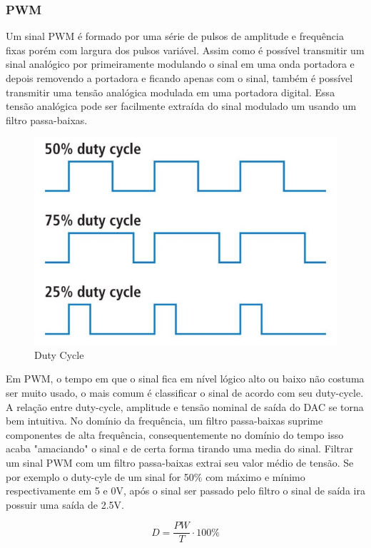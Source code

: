 \subsubsection{PWM}
Um sinal PWM é formado por uma série de pulsos de amplitude e frequência fixas porém com largura dos pulsos variável. Assim como é possível transmitir um sinal analógico por primeiramente modulando o sinal em uma onda portadora e depois removendo a portadora e ficando apenas com o sinal, também é possível transmitir uma tensão analógica modulada em uma portadora digital. Essa tensão analógica pode ser facilmente extraída do sinal modulado um usando um filtro passa-baixas.
\begin{figure}[htbp]
	\centering
	\includegraphics[scale=0.3]{figuras/duty_cycle.jpg}
	\caption{Duty Cycle}
	\label{duty_cycle}
\end{figure}
Em PWM, o tempo em que o sinal fica em nível lógico alto ou baixo não costuma ser muito usado, o mais comum é classificar o sinal de acordo com seu duty-cycle. A relação entre duty-cycle, amplitude e tensão nominal de saída do DAC se torna bem intuitiva. No domínio da frequência, um filtro passa-baixas suprime componentes de alta frequência, consequentemente no domínio do tempo isso acaba "amaciando" o sinal e de certa forma tirando uma media do sinal. Filtrar um sinal PWM com um filtro passa-baixas extrai seu valor médio de tensão. Se por exemplo o duty-cyle de um sinal for 50\% com máximo e mínimo respectivamente em 5 e 0V, após o sinal ser passado pelo filtro o sinal de saída ira possuir uma saída de 2.5V.

\begin{equation}\label{calc-duty-cycle}
	D=\frac{ PW }{ T } \cdot 100 \%
\end{equation}

